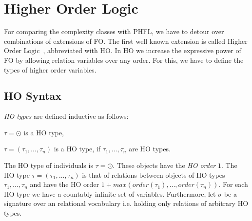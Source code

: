 

\section{Higher Order Logic}\label{sec:higherOrderLogic}

For comparing the complexity classes with PHFL, we have to detour over combinations of extensions of FO. The first well
known extension is called Higher Order Logic~\cite{vanBenthem2001higher}, abbreviated with HO. In HO we
increase the expressive power of FO by allowing relation variables over any order. For this, we have to define the
types of higher order variables.

\subsection{HO Syntax}\label{subsec:hoSyntax}

\begin{definition}
    \emph{HO types} are defined inductive as follows:
    \begin{compactitem}
        \item $\tau = \odot$ is a HO type,
        \item $\tau = (\tau_1, \dots, \tau_n)$ is a HO type, if $\tau_1, \dots, \tau_n$ are
        HO types.
    \end{compactitem}
\end{definition}

The HO type of individuals is $\tau = \odot$. These objects have the \textit{HO order} $1$. The HO type $\tau = (\tau_1,
\dots, \tau_n)$ is that of relations between objects of HO types $\tau_1, \dots, \tau_n$ and have the HO order $1 + max
(order(\tau_1), \dots, order(\tau_n))$. For each HO type we have a countably infinite set of variables. Furthermore,
let $\sigma$ be a signature over an relational vocabulary i.e. holding only relations of arbitrary HO types.

